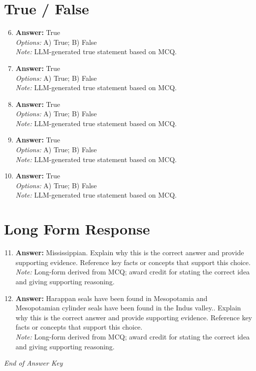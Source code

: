 \documentclass[12pt]{article}
\begin{document}
\section*{True / False}
\begin{enumerate}[label=\arabic*.]
\setcounter{enumi}{5}
\item \textbf{Answer:} True
\\ \textit{Options:} A) True; B) False
\\ \textit{Note:} LLM-generated true statement based on MCQ.
\item \textbf{Answer:} True
\\ \textit{Options:} A) True; B) False
\\ \textit{Note:} LLM-generated true statement based on MCQ.
\item \textbf{Answer:} True
\\ \textit{Options:} A) True; B) False
\\ \textit{Note:} LLM-generated true statement based on MCQ.
\item \textbf{Answer:} True
\\ \textit{Options:} A) True; B) False
\\ \textit{Note:} LLM-generated true statement based on MCQ.
\item \textbf{Answer:} True
\\ \textit{Options:} A) True; B) False
\\ \textit{Note:} LLM-generated true statement based on MCQ.
\end{enumerate}

\section*{Long Form Response}
\begin{enumerate}[label=\arabic*.]
\setcounter{enumi}{10}
\item \textbf{Answer:} Mississippian. Explain why this is the correct answer and provide supporting evidence. Reference key facts or concepts that support this choice.
\\ \textit{Note:} Long-form derived from MCQ; award credit for stating the correct idea and giving supporting reasoning.
\item \textbf{Answer:} Harappan seals have been found in Mesopotamia and Mesopotamian cylinder seals have been found in the Indus valley.. Explain why this is the correct answer and provide supporting evidence. Reference key facts or concepts that support this choice.
\\ \textit{Note:} Long-form derived from MCQ; award credit for stating the correct idea and giving supporting reasoning.
\end{enumerate}

\vfill
\noindent\textit{End of Answer Key}
\end{document}
